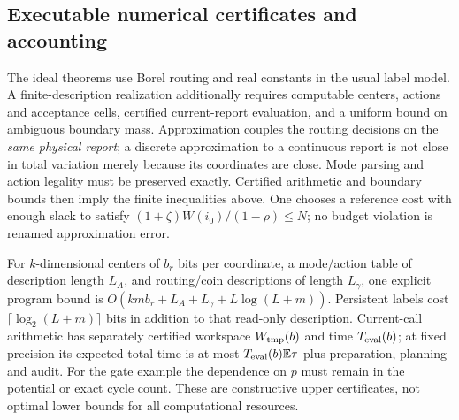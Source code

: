 \subsection*{Executable numerical certificates and accounting}
The ideal theorems use Borel routing and real constants in the usual label model. A finite-description realization additionally requires computable centers, actions and acceptance cells, certified current-report evaluation, and a uniform bound on ambiguous boundary mass. Approximation couples the routing decisions on the \emph{same physical report}; a discrete approximation to a continuous report is not close in total variation merely because its coordinates are close. Mode parsing and action legality must be preserved exactly. Certified arithmetic and boundary bounds then imply the finite inequalities above. One chooses a reference cost with enough slack to satisfy $(1+\zeta)W(i_0)/(1-\rho)\le N$; no budget violation is renamed approximation error.

For $k$-dimensional centers of $b_r$ bits per coordinate, a mode/action table of description length $L_A$, and routing/coin descriptions of length $L_\gamma$, one explicit program bound is $O(kmb_r+L_A+L_\gamma+L\log(L+m))$. Persistent labels cost $\lceil\log_2(L+m)\rceil$ bits in addition to that read-only description. Current-call arithmetic has separately certified workspace $W_{\rm tmp}(b)$ and time $T_{\rm eval}(b)$; at fixed precision its expected total time is at most $T_{\rm eval}(b)\mathbb E\tau$ plus preparation, planning and audit. For the gate example the dependence on $p$ must remain in the potential or exact cycle count. These are constructive upper certificates, not optimal lower bounds for all computational resources.
